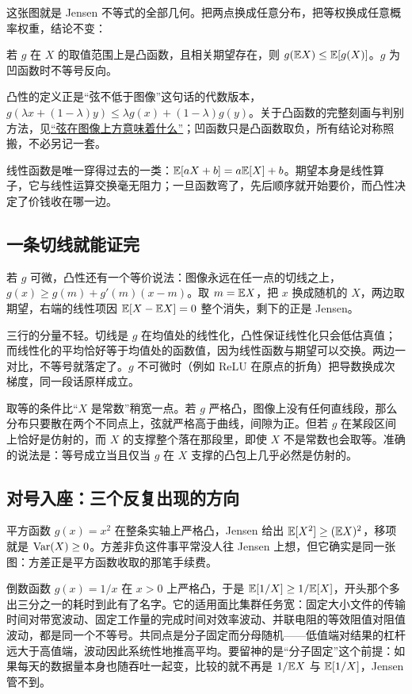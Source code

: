 这张图就是 Jensen 不等式的全部几何。把两点换成任意分布，把等权换成任意概率权重，结论不变：

\begin{theorem}
若 \(g\) 在 \(X\) 的取值范围上是凸函数，且相关期望存在，则 \(g(\mathbb{E} X)\le\mathbb{E}[g(X)]\)。\(g\) 为凹函数时不等号反向。
\end{theorem}

凸性的定义正是``弦不低于图像''这句话的代数版本，\(g(\lambda x+(1-\lambda)y)\le\lambda g(x)+(1-\lambda)g(y)\)。关于凸函数的完整刻画与判别方法，见\hyperref[sec:09-Convex-Optimization/03-Convex-Functions/01]{``弦在图像上方意味着什么''}；凹函数只是凸函数取负，所有结论对称照搬，不必另记一套。

线性函数是唯一穿得过去的一类：\(\mathbb{E}[aX+b]=a\mathbb{E}[X]+b\)。期望本身是线性算子，它与线性运算交换毫无阻力；一旦函数弯了，先后顺序就开始要价，而凸性决定了价钱收在哪一边。

\subsection{一条切线就能证完}

若 \(g\) 可微，凸性还有一个等价说法：图像永远在任一点的切线之上，\(g(x)\ge g(m)+g'(m)(x-m)\)。取 \(m=\mathbb{E} X\)，把 \(x\) 换成随机的 \(X\)，两边取期望，右端的线性项因 \(\mathbb{E}[X-\mathbb{E} X]=0\) 整个消失，剩下的正是 Jensen。

三行的分量不轻。切线是 \(g\) 在均值处的线性化，凸性保证线性化只会低估真值；而线性化的平均恰好等于均值处的函数值，因为线性函数与期望可以交换。两边一对比，不等号就落定了。\(g\) 不可微时（例如 ReLU 在原点的折角）把导数换成次梯度，同一段话原样成立。

取等的条件比``\(X\) 是常数''稍宽一点。若 \(g\) 严格凸，图像上没有任何直线段，那么分布只要散在两个不同点上，弦就严格高于曲线，间隙为正。但若 \(g\) 在某段区间上恰好是仿射的，而 \(X\) 的支撑整个落在那段里，即使 \(X\) 不是常数也会取等。准确的说法是：等号成立当且仅当 \(g\) 在 \(X\) 支撑的凸包上几乎必然是仿射的。

\subsection{对号入座：三个反复出现的方向}

平方函数 \(g(x)=x^2\) 在整条实轴上严格凸，Jensen 给出 \(\mathbb{E}[X^2]\ge(\mathbb{E} X)^2\)，移项就是 \(\operatorname{Var}(X)\ge0\)。方差非负这件事平常没人往 Jensen 上想，但它确实是同一张图：方差正是平方函数收取的那笔手续费。

倒数函数 \(g(x)=1/x\) 在 \(x>0\) 上严格凸，于是 \(\mathbb{E}[1/X]\ge1/\mathbb{E}[X]\)，开头那个多出三分之一的耗时到此有了名字。它的适用面比集群任务宽：固定大小文件的传输时间对带宽波动、固定工作量的完成时间对效率波动、并联电阻的等效阻值对阻值波动，都是同一个不等号。共同点是分子固定而分母随机——低值端对结果的杠杆远大于高值端，波动因此系统性地推高平均。要留神的是``分子固定''这个前提：如果每天的数据量本身也随吞吐一起变，比较的就不再是 \(1/\mathbb{E} X\) 与 \(\mathbb{E}[1/X]\)，Jensen 管不到。

